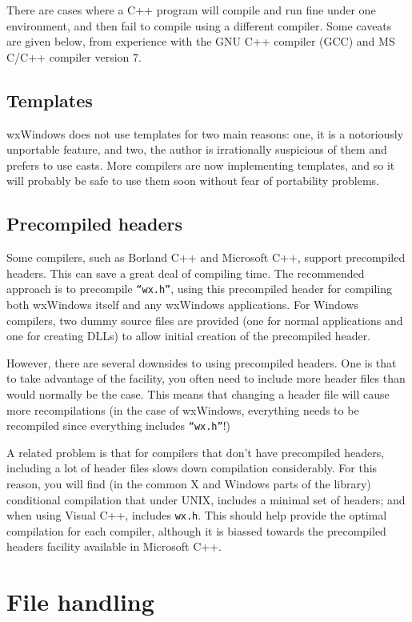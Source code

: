 There are cases where a C++ program will compile and run fine under one
environment, and then fail to compile using a different compiler. Some
caveats are given below, from experience with the GNU C++ compiler (GCC)
and MS C/C++ compiler version 7.

\subsection{Templates}

wxWindows does not use templates for two main reasons: one, it is a
notoriously unportable feature, and two, the author is irrationally
suspicious of them and prefers to use casts. More compilers are
now implementing templates, and so it will probably be safe to use
them soon without fear of portability problems.

\subsection{Precompiled headers}

Some compilers, such as Borland C++ and Microsoft C++, support
precompiled headers. This can save a great deal of compiling time. The
recommended approach is to precompile {\tt ``wx.h''}, using this
precompiled header for compiling both wxWindows itself and any
wxWindows applications. For Windows compilers, two dummy source files
are provided (one for normal applications and one for creating DLLs)
to allow initial creation of the precompiled header.

However, there are several downsides to using precompiled headers. One
is that to take advantage of the facility, you often need to include
more header files than would normally be the case. This means that
changing a header file will cause more recompilations (in the case of
wxWindows, everything needs to be recompiled since everything includes
{\tt ``wx.h''}!)

A related problem is that for compilers that don't have precompiled
headers, including a lot of header files slows down compilation
considerably. For this reason, you will find (in the common
X and Windows parts of the library) conditional
compilation that under UNIX, includes a minimal set of headers;
and when using Visual C++, includes {\tt wx.h}. This should help provide
the optimal compilation for each compiler, although it is
biassed towards the precompiled headers facility available
in Microsoft C++.

\section{File handling}

